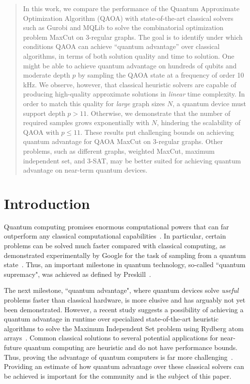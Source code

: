 \documentclass[prb,reprint,nofootinbib,longbibliography,superscriptaddress]{revtex4-1}
\begin{document}
	\begin{abstract}
In this work, we compare the performance of the Quantum Approximate Optimization Algorithm (QAOA) with  state-of-the-art classical solvers such as Gurobi and MQLib to solve the combinatorial optimization problem MaxCut on 3-regular graphs. The goal is to identify under which conditions QAOA can achieve “quantum advantage” over classical algorithms,  in terms of both solution quality and time to solution.
One might be able to achieve quantum advantage on hundreds of qubits and moderate depth $p$ by sampling the QAOA state at a frequency of order 10 kHz.
We observe, however, that classical heuristic solvers are capable of producing high-quality approximate solutions in \textit{linear} time complexity.
In order to match this quality for \textit{large} graph sizes $N$, a quantum device must support depth $p>11$.
Otherwise, we demonstrate that 
the number of required samples grows exponentially with $N$, hindering the scalability of QAOA with $p\leq11$.
These results put challenging bounds on achieving quantum advantage for QAOA MaxCut on 3-regular graphs.
Other problems, such as different graphs, weighted MaxCut, maximum independent set, and 3-SAT, may be better suited for achieving quantum advantage on near-term quantum devices.

	\end{abstract}
	
	
	\maketitle
	



\section{Introduction}


Quantum computing promises enormous computational powers that can far outperform any classical computational capabilities~\cite{alexeev2021quantum}. In particular, certain problems can be solved much faster compared with classical computing, as demonstrated experimentally by Google for the task of sampling from a quantum state~\cite{arute2019quantum}.
Thus,  an important milestone \cite{arute2019quantum} in quantum technology, so-called ``quantum supremacy", was achieved as defined by Preskill~\cite{preskill2012quantum}. 

The next milestone, ``quantum advantage", where quantum devices  solve \textit{useful} problems faster than classical hardware, is more elusive and has arguably not  yet been demonstrated. However, a recent study suggests a possibility of achieving a quantum advantage in runtime over specialized state-of-the-art heuristic algorithms to solve the Maximum Independent Set problem using Rydberg atom arrays~\cite{ebadi2022}.
Common classical solutions to several potential applications for near-future quantum computing are heuristic and do not have performance bounds. Thus,  proving the advantage of quantum computers is far more challenging~\cite{Guerreschi2019,Zhou2020,Serret2020}.
Providing an estimate of how quantum advantage over these classical solvers can be achieved is important for the community and is the subject of this paper.
\end{document}
